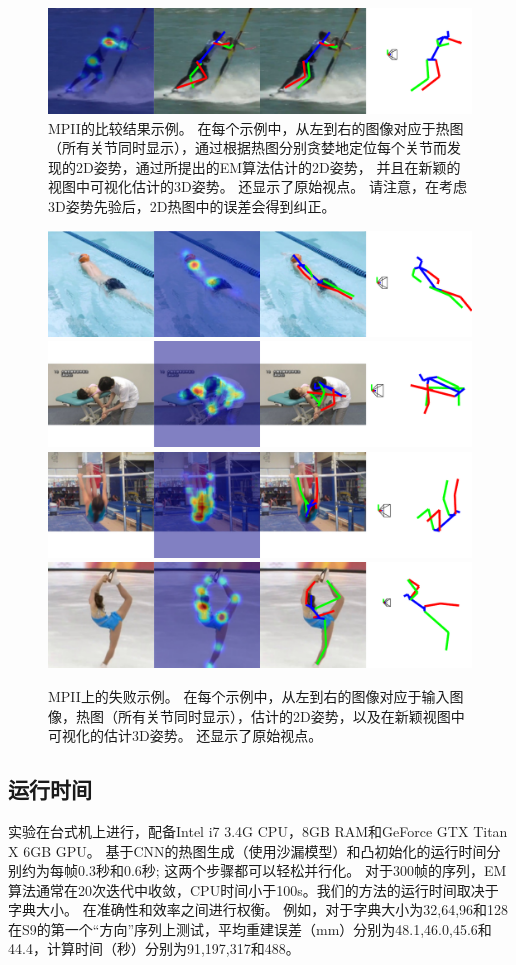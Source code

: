 \begin{figure}
  \includegraphics[width=0.48\linewidth]{figures/examples/mpii/pos-039.pdf}
  \caption{MPII\cite{andriluka14cvpr}的比较结果示例。 在每个示例中，从左到右的图像对应于热图（所有关节同时显示），通过根据热图分别贪婪地定位每个关节而发现的2D姿势，通过所提出的EM算法估计的2D姿势， 并且在新颖的视图中可视化估计的3D姿势。 还显示了原始视点。 请注意，在考虑3D姿势先验后，2D热图中的误差会得到纠正。}\label{fig:mpii-improve}
\end{figure}


\begin{figure}
  \centering
  \includegraphics[width=0.48\linewidth]{figures/examples/mpii/bad-042.pdf}
  \includegraphics[width=0.48\linewidth]{figures/examples/mpii/bad-007.pdf}
  \includegraphics[width=0.48\linewidth]{figures/examples/mpii/bad-008.pdf}
  \includegraphics[width=0.48\linewidth]{figures/examples/mpii/bad-025.pdf}
  \caption{MPII\cite{andriluka14cvpr}上的失败示例。 在每个示例中，从左到右的图像对应于输入图像，热图（所有关节同时显示），估计的2D姿势，以及在新颖视图中可视化的估计3D姿势。 还显示了原始视点。 }\label{fig:mpii-bad}
\end{figure}

\subsection{运行时间}

实验在台式机上进行，配备Intel i7 3.4G CPU，8GB RAM和GeForce GTX Titan X 6GB GPU。
基于CNN的热图生成（使用沙漏模型）和凸初始化的运行时间分别约为每帧0.3秒和0.6秒; 这两个步骤都可以轻松并行化。 对于300帧的序列，EM算法通常在20次迭代中收敛，CPU时间小于100s。我们的方法的运行时间取决于字典大小。 在准确性和效率之间进行权衡。 例如，对于字典大小为32,64,96和128
在S9的第一个“方向”序列上测试，平均重建误差（mm）分别为48.1,46.0,45.6和44.4，计算时间（秒）分别为91,197,317和488。